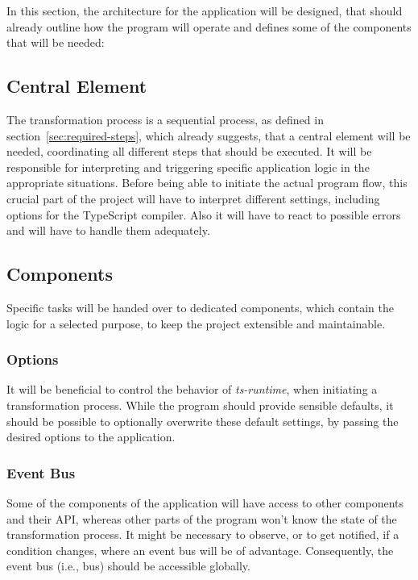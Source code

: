 In this section, the architecture for the application will be designed, that should already outline how the program will operate and defines some of the components that will be needed:

\subsection{Central Element}

The transformation process is a sequential process, as defined in section~\ref{sec:required-steps}, which already suggests, that a central element will be needed, coordinating all different steps that should be executed. It will be responsible for interpreting and triggering specific application logic in the appropriate situations. Before being able to initiate the actual program flow, this crucial part of the project will have to interpret different settings, including options for the TypeScript compiler. Also it will have to react to possible errors and will have to handle them adequately.

\subsection{Components}

Specific tasks will be handed over to dedicated components, which contain the logic for a selected purpose, to keep the project extensible and maintainable.

\subsubsection{Options}

It will be beneficial to control the behavior of \emph{ts-runtime}, when initiating a transformation process. While the program should provide sensible defaults, it should be possible to optionally overwrite these default settings, by passing the desired options to the application.

\subsubsection{Event Bus}

Some of the components of the application will have access to other components and their API, whereas other parts of the program won't know the state of the transformation process. It might be necessary to observe, or to get notified, if a condition changes, where an event bus will be of advantage. Consequently, the event bus (i.e., bus) should be accessible globally. 

